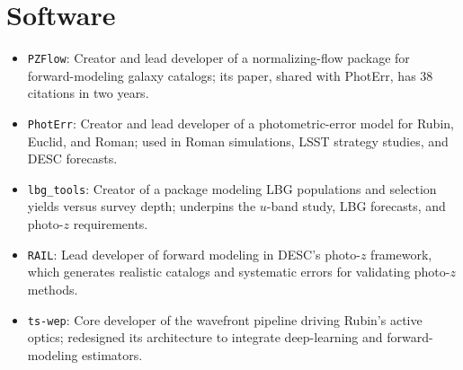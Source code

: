 \section{Software}
\begin{itemize}[leftmargin=2em, itemindent=-2em]
    \item \texttt{PZFlow}:
        Creator and lead developer of a normalizing-flow package for forward-modeling galaxy catalogs; its paper, shared with PhotErr, has 38 citations in two years.
        \href{https://github.com/jfcrenshaw/pzflow}{\faGithub}~%
        \href{https://pypi.org/project/pzflow/}{\faCloudDownload}

    \item \texttt{PhotErr}:
        Creator and lead developer of a photometric-error model for Rubin, Euclid, and Roman; used in Roman simulations, LSST strategy studies, and DESC forecasts.
        \href{https://github.com/jfcrenshaw/photerr}{\faGithub}~%
        \href{https://pypi.org/project/photerr/}{\faCloudDownload}

    \item \texttt{lbg\_tools}:
        Creator of a package modeling LBG populations and selection yields versus survey depth; underpins the $u$-band study, LBG forecasts, and photo-$z$ requirements.
        \href{https://github.com/jfcrenshaw/lbg_tools}{\faGithub}~%
        \href{https://pypi.org/project/lbg-tools/}{\faCloudDownload}

    \item \texttt{RAIL}:
        Lead developer of forward modeling in DESC's photo-$z$ framework, which generates realistic catalogs and systematic errors for validating photo-$z$ methods.
        \href{https://github.com/LSSTDESC/RAIL}{\faGithub}~%
        \href{https://pypi.org/project/pz-rail/}{\faCloudDownload}

    \item \texttt{ts-wep}:
        Core developer of the wavefront pipeline driving Rubin's active optics; redesigned its architecture to integrate deep-learning and forward-modeling estimators.
        \href{https://github.com/lsst-ts/ts_wep}{\faGithub}
\end{itemize}
